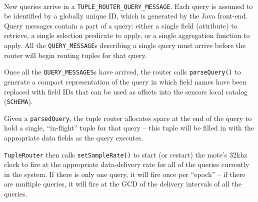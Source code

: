 \documentclass[11pt]{article}
\begin{document}
\vspace{1em}
\\
New queries arrive in a {\tt TUPLE\_ROUTER\_QUERY\_MESSAGE}.  Each query
  is assumed to be identified by a globally unique ID, which is
  generated by the Java front-end.  Query
  messages contain a part of a query: either a single field (attribute) to
  retrieve, a single selection predicate to apply, or a single
  aggregation function to apply.  All the {\tt QUERY\_MESSAGE}s describing a
  single query must arrive before the router will begin routing tuples
  for that query.

Once all the {\tt QUERY\_MESSAGES}s have arrived, the router calls
  {\tt parseQuery()} to generate a compact representation of the query in
  which field names have been replaced with field IDs that can be used
  as offsets into the sensors local catalog ({\tt SCHEMA}).
  
Given a {\tt parsedQuery}, the tuple router allocates space at the end
  of the query to hold a single, ``in-flight'' tuple for that query --
  this tuple will be filled in with the appropriate data fields as the
  query executes.
  
{\tt TupleRouter} then calls {\tt setSampleRate()} to start (or restart) the
  mote's 32khz clock to fire at the appropriate data-delivery rate for
  all of the queries currently in the system.  If there is only one
  query, it will fire once per ``epoch'' -- if there are multiple queries,
  it will fire at the GCD of the delivery intervals of all the queries.
\end{document}

